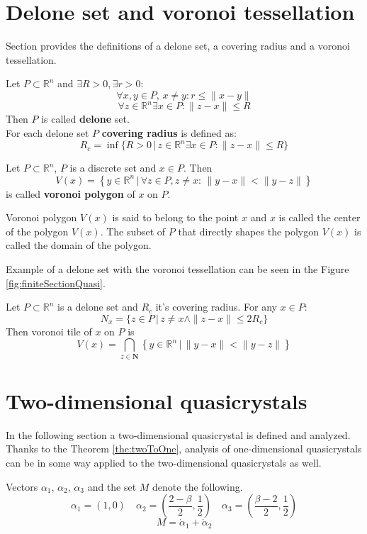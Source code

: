 \documentclass[text.tex]{subfiles}
\begin{document}
\section*{Delone set and voronoi tessellation}

Section provides the definitions of a delone set, a covering radius and a voronoi tessellation.

\begin{definition}
\label{def:delone}
Let $P\subset \mathbb{R}^n$ and $\exists R>0, \exists r>0$:
$$\forall x,y\in P,\, x\neq y: r\leq \|x-y\|$$
$$\forall z\in\mathbb{R}^n \exists x\in P: \|z-x\|\leq R$$
Then $P$ is called \textbf{delone} set.\\
For each delone set $P$ \textbf{covering radius} is defined as:
$$R_c = \inf\{R>0\,|\, z\in\mathbb{R}^n \exists x\in P: \|z-x\|\leq R\}$$
\end{definition}

\begin{definition}
Let $P\subset \mathbb{R}^n$, $P$ is a discrete set and $x\in P$. Then
$$V(x) = \left\{ y \in \mathbb{R}^n \,|\, \forall z \in P, z\neq x:\, \|y-x\|<\|y-z\| \right\}$$
is called \textbf{voronoi polygon} of $x$ on $P$.

Voronoi polygon $V(x)$ is said to belong to the point $x$ and $x$ is called the center of the polygon $V(x)$. The subset of $P$ that directly shapes the polygon $V(x)$ is called the domain of the polygon.
\end{definition}

\begin{remark}
Example of a delone set with the voronoi tessellation can be seen in the Figure \ref{fig:finiteSectionQuasi}.
\end{remark}

\begin{theorem}
\label{the:radiusLimit}
Let $P\subset \mathbb{R}^n$ is a delone set and $R_c$ it's covering radius. For any $x\in P$:
$$N_x = \{z\in P\,|\, z\neq x \wedge \|z-x\|\leq 2R_c\}$$
Then voronoi tile of $x$ on $P$ is
$$V(x) = \bigcap_{z\in \boldsymbol{N}} \left\{ y \in \mathbb{R}^n \,|\, \|y-x\|<\|y-z\| \right\}$$
\end{theorem}

%
\clearpage
\section{Two-dimensional quasicrystals}%
\label{sec:twoDimension}
In the following section a two-dimensional quasicrystal is defined and analyzed. Thanks to the Theorem \ref{the:twoToOne}, analysis of one-dimensional quasicrystals can be in some way applied to the two-dimensional quasicrystals as well. 
\begin{definition}
Vectors $\alpha_1$, $\alpha_2$, $\alpha_3$ and the set $M$ denote the following.
$$\alpha_1 = \left( 1,0 \right) \quad \alpha_2 = \left( \frac{2-\beta}{2}, \frac{1}{2} \right) \quad \alpha_3 = \left( \frac{\beta-2}{2}, \frac{1}{2} \right)$$
$$M = \ring\alpha_1 + \ring\alpha_2$$
\end{definition}
\end{document}
